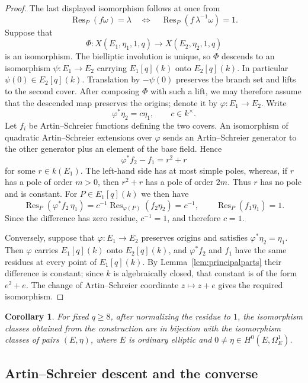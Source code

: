 \documentclass[11pt]{article}
\newtheorem{corollary}[theorem]{Corollary}
\theoremstyle{remark}
\newcommand{\Res}{\operatorname{Res}}
\begin{document}
\begin{proof}
The last displayed isomorphism follows at once from
\[
        \Res_P(f\omega)=\lambda
        \quad\Longleftrightarrow\quad
        \Res_P(f\,\lambda^{-1}\omega)=1.
\]
Suppose that
\[
 \Phi:X(E_1,\eta_1,1,q)\longrightarrow X(E_2,\eta_2,1,q)
\]
is an isomorphism.  The bielliptic involution is unique, so $\Phi$
descends to an isomorphism $\psi:E_1\to E_2$ carrying
$E_1[q](k)$ onto $E_2[q](k)$.  In particular $\psi(0)\in E_2[q](k)$.
Translation by $-\psi(0)$ preserves the branch set and lifts to the
second cover.  After composing $\Phi$ with such a lift, we may therefore
assume that the descended map preserves the origins; denote it by
$\varphi:E_1\to E_2$.  Write
\[
        \varphi^*\eta_2=c\eta_1,\qquad c\in k^\times.
\]
Let $f_i$ be Artin--Schreier functions defining the two covers.  An
isomorphism of quadratic Artin--Schreier extensions over $\varphi$
sends an Artin--Schreier generator to the other generator plus an
element of the base field.  Hence
\[
        \varphi^*f_2-f_1=r^2+r
\]
for some $r\in k(E_1)$.  The left-hand side has at most simple poles,
whereas, if $r$ has a pole of order $m>0$, then $r^2+r$ has a pole of
order $2m$.  Thus $r$ has no pole and is constant.  For
$P\in E_1[q](k)$ we then have
\[
 \Res_P(\varphi^*f_2\,\eta_1)
   =c^{-1}\Res_{\varphi(P)}(f_2\eta_2)=c^{-1},
 \qquad
 \Res_P(f_1\eta_1)=1.
\]
Since the difference has zero residue, $c^{-1}=1$, and therefore
$c=1$.

Conversely, suppose that $\varphi:E_1\to E_2$ preserves origins and
satisfies $\varphi^*\eta_2=\eta_1$.  Then $\varphi$ carries
$E_1[q](k)$ onto $E_2[q](k)$, and $\varphi^*f_2$ and $f_1$ have the same
residues at every point of $E_1[q](k)$.  By
Lemma~\ref{lem:principalparts} their difference is constant; since $k$
is algebraically closed, that constant is of the form $e^2+e$.  The
change of Artin--Schreier coordinate $z\mapsto z+e$ gives the required
isomorphism.
\end{proof}

\begin{corollary}\label{cor:intrinsic-parameter}
For fixed $q\ge8$, after normalizing the residue to $1$, the isomorphism
classes obtained from the construction are in bijection with the
isomorphism classes of pairs $(E,\eta)$, where $E$ is ordinary elliptic
and $0\ne\eta\in H^0(E,\Omega_E^1)$.
\end{corollary}

\subsection{Artin--Schreier descent and the converse}
\end{document}
